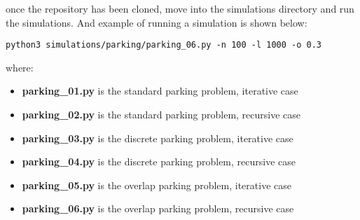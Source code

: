 once the repository has been cloned, move into the simulations directory 
and run the simulations. And example of running a simulation is shown 
below: \bigskip

\begin{lstlisting}[numbers=none]
	python3 simulations/parking/parking_06.py -n 100 -l 1000 -o 0.3
\end{lstlisting} \bigskip

where: \bigskip

\begin{itemize}
	\item \textbf{parking\_01.py} is the standard parking problem, iterative case
	\item \textbf{parking\_02.py} is the standard parking problem, recursive case
	\item \textbf{parking\_03.py} is the discrete parking problem, iterative case
	\item \textbf{parking\_04.py} is the discrete parking problem, recursive case
	\item \textbf{parking\_05.py} is the overlap parking problem, iterative case
	\item \textbf{parking\_06.py} is the overlap parking problem, recursive case
\end{itemize}\medskip

